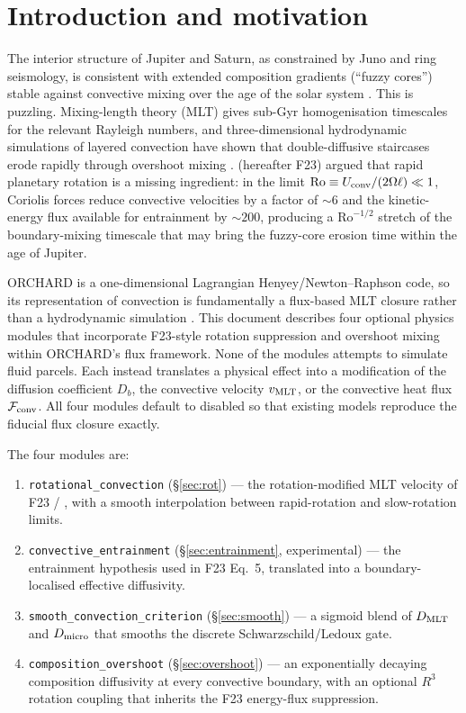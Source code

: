 \documentclass{aastex631}
\newcommand{\Vmlt}{v_{\rm MLT}}
\newcommand{\Vconv}{U_{\rm conv}}
\newcommand{\Roo}{\mathrm{Ro}}
\newcommand{\Dmlt}{D_{\rm MLT}}
\newcommand{\Dmicro}{D_{\rm micro}}
\begin{document}
\section{Introduction and motivation}\label{sec:intro}

The interior structure of Jupiter and Saturn, as constrained by Juno
and ring seismology, is consistent with extended composition gradients
(``fuzzy cores'') stable against convective mixing over the age of the
solar system \citep{Wahl2017,Mankovich2021,Howard2023}.  This is
puzzling.  Mixing-length theory (MLT) gives sub-Gyr
homogenisation timescales for the relevant Rayleigh numbers, and
three-dimensional hydrodynamic simulations of layered convection have
shown that double-diffusive staircases erode rapidly through
overshoot mixing \citep{Wood2013,Garaud2018,Fuentes2022PhRvF}.
\citet{Fuentes2023ApJL} (hereafter F23) argued that rapid planetary
rotation is a missing ingredient: in the limit
$\Roo \equiv \Vconv / (2\Omega \ell) \ll 1$, Coriolis forces reduce
convective velocities by a factor of $\sim 6$ and the kinetic-energy
flux available for entrainment by $\sim 200$, producing a
$\Roo^{-1/2}$ stretch of the boundary-mixing timescale that may bring
the fuzzy-core erosion time within the age of Jupiter.

ORCHARD is a one-dimensional Lagrangian Henyey/Newton--Raphson
code, so its representation of convection is fundamentally a
flux-based MLT closure rather than a hydrodynamic simulation
\citep{TejadaArevalo2026orchard}.  This document describes four
optional physics modules that incorporate F23-style rotation
suppression and overshoot mixing within ORCHARD's flux framework.
None of the modules attempts to simulate fluid parcels.  Each
instead translates a physical effect into a modification of the
diffusion coefficient $D_b$, the convective velocity $\Vmlt$, or
the convective heat flux $\mathcal{F}_{\rm conv}$.  All four
modules default to disabled so that existing models reproduce the
fiducial flux closure exactly.

The four modules are:
\begin{enumerate}
\item \texttt{rotational\_convection} (\S\ref{sec:rot}) --- the
  rotation-modified MLT velocity of F23 / \citet{Aurnou2020}, with a
  smooth interpolation between rapid-rotation and slow-rotation limits.
\item \texttt{convective\_entrainment} (\S\ref{sec:entrainment},
  experimental) --- the \citet{Linden1975} entrainment hypothesis
  used in F23 Eq.~5, translated into a boundary-localised effective
  diffusivity.
\item \texttt{smooth\_convection\_criterion} (\S\ref{sec:smooth}) ---
  a sigmoid blend of $\Dmlt$ and $\Dmicro$ that smooths the discrete
  Schwarzschild/Ledoux gate.
\item \texttt{composition\_overshoot} (\S\ref{sec:overshoot}) --- an
  exponentially decaying composition diffusivity at every convective
  boundary, with an optional $R^3$ rotation coupling that inherits the
  F23 energy-flux suppression.
\end{enumerate}
\end{document}
